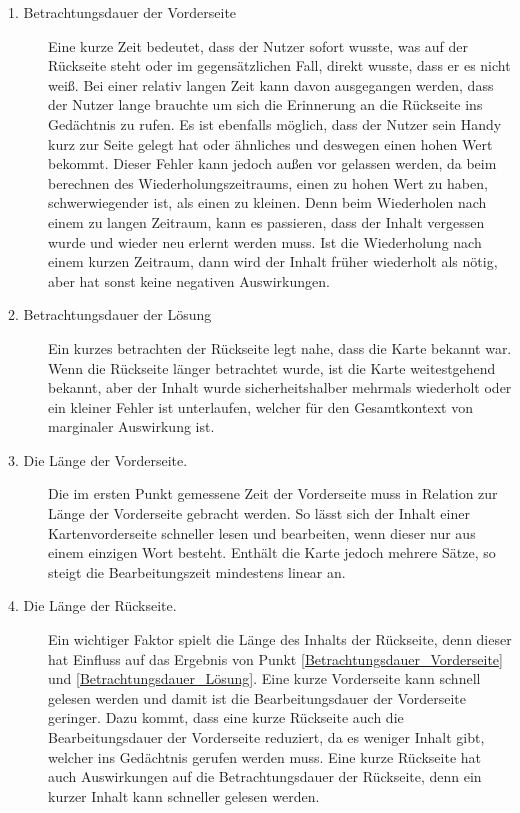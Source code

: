 \begin{description}
\item[1. Betrachtungsdauer der Vorderseite] \label{Betrachtungsdauer_Vorderseite}
Eine kurze Zeit bedeutet, dass der Nutzer sofort wusste, was auf der Rückseite steht oder im gegensätzlichen Fall, direkt wusste, dass er es nicht weiß. Bei einer relativ langen Zeit kann davon ausgegangen werden, dass der Nutzer lange brauchte um sich die Erinnerung an die Rückseite ins Gedächtnis zu rufen. Es ist ebenfalls möglich, dass der Nutzer sein Handy kurz zur Seite gelegt hat oder ähnliches und deswegen einen hohen Wert bekommt. Dieser Fehler kann jedoch außen vor gelassen werden, da beim berechnen des Wiederholungszeitraums, einen zu hohen Wert zu haben, schwerwiegender ist, als einen zu kleinen. Denn beim Wiederholen nach einem zu langen Zeitraum, kann es passieren, dass der Inhalt vergessen wurde und wieder neu erlernt werden muss. Ist die Wiederholung nach einem kurzen Zeitraum, dann wird der Inhalt früher wiederholt als nötig, aber hat sonst keine negativen Auswirkungen.
\item[2. Betrachtungsdauer der Lösung]
\label{Betrachtungsdauer_Lösung}
Ein kurzes betrachten der Rückseite legt nahe, dass die Karte bekannt war. Wenn die Rückseite länger betrachtet wurde, ist die Karte weitestgehend bekannt, aber der Inhalt wurde sicherheitshalber mehrmals wiederholt oder ein kleiner Fehler ist unterlaufen, welcher für den Gesamtkontext von marginaler Auswirkung ist.
\item[3. Die Länge der Vorderseite.]
Die im ersten Punkt gemessene Zeit der Vorderseite muss in Relation zur Länge der Vorderseite gebracht werden. So lässt sich der Inhalt einer Kartenvorderseite schneller lesen und bearbeiten, wenn dieser nur aus einem einzigen Wort besteht. Enthält die Karte jedoch mehrere Sätze, so steigt die Bearbeitungszeit mindestens linear an.
\item[4. Die Länge der Rückseite.]
Ein wichtiger Faktor spielt die Länge des Inhalts der Rückseite, denn dieser hat Einfluss auf das Ergebnis von Punkt \ref{Betrachtungsdauer_Vorderseite} und \ref{Betrachtungsdauer_Lösung}. Eine kurze Vorderseite kann schnell gelesen werden und damit ist die Bearbeitungsdauer der Vorderseite geringer. Dazu kommt, dass eine kurze Rückseite auch die Bearbeitungsdauer der Vorderseite reduziert, da es weniger Inhalt gibt, welcher ins Gedächtnis gerufen werden muss. Eine kurze Rückseite hat auch Auswirkungen auf die Betrachtungsdauer der Rückseite, denn ein kurzer Inhalt kann schneller gelesen werden.
\end{description}

